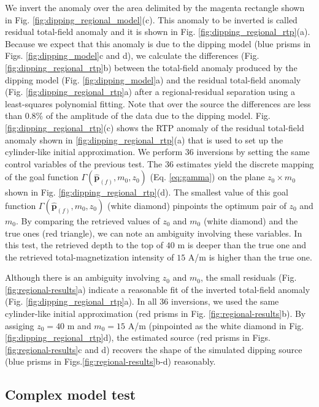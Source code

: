 We invert the anomaly over the area delimited by the magenta rectangle shown in Fig. \ref{fig:dipping_regional_model}(c).
This anomaly to be inverted is called residual total-field anomaly and it is shown in 
Fig. \ref{fig:dipping_regional_rtp}(a).
Because we expect that this anomaly is due to the dipping model (blue prisms in Figs. \ref{fig:dipping_model}c and d), we calculate the 
differences (Fig. \ref{fig:dipping_regional_rtp}b) between the total-field anomaly produced by the dipping model (Fig. \ref{fig:dipping_model}a) and the residual total-field anomaly 
(Fig. \ref{fig:dipping_regional_rtp}a) after a regional-residual separation using a least-squares polynomial fitting. 
Note that over the source the differences are less than $ 0.8\%$ of the amplitude of the data due to the dipping model.
Fig. \ref{fig:dipping_regional_rtp}(c) shows the RTP anomaly of the residual total-field anomaly shown in \ref{fig:dipping_regional_rtp}(a) that is used to set up the 
cylinder-like initial approximation.
We perform $ 36 $ inversions by setting the same control variables of the previous test.
The $ 36 $ estimates yield the discrete mapping of the goal function $\Gamma (\hat{\mathbf{p}}_{(f)}, m_{0}, z_{0})$ (Eq. \ref{eq:gamma}) 
on the plane $z_0 \times m_0 $ shown in Fig. \ref{fig:dipping_regional_rtp}(d).
The smallest value of this goal function $\Gamma (\hat{\mathbf{p}}_{(f)}, m_{0}, z_{0})$ (white diamond) pinpoints 
the optimum pair of $z_0$ and $m_0$.
By comparing the retrieved values of $z_0$ and $m_0$ (white diamond) and
the true ones (red triangle), we can note an ambiguity involving these variables.
In this test, the retrieved depth to the top of $ 40 $ m is deeper than the true one and the 
retrieved total-magnetization intensity of $ 15 $ A/m is higher than the true one.

Although there is an ambiguity involving $z_0$ and $m_0$, the small residuals (Fig. \ref{fig:regional-results}a) indicate a reasonable fit of the inverted total-field anomaly
(Fig. \ref{fig:dipping_regional_rtp}a).
In all 36 inversions, we used the same cylinder-like initial approximation (red prisms in Fig. \ref{fig:regional-results}b).
By assiging $z_0 = 40$ m and $m_0 = 15$ A/m (pinpointed as the white diamond in Fig. \ref{fig:dipping_regional_rtp}d), the estimated source (red prisms in Figs.\ref{fig:regional-results}c and d) recovers the shape of the simulated dipping source 
(blue prisms in Figs.\ref{fig:regional-results}b-d) reasonably.

\subsection{Complex model test}

